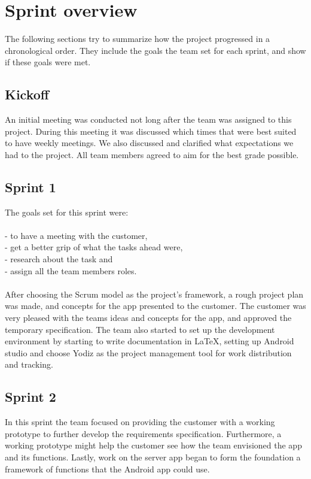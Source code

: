 \section{Sprint overview}
The following sections try to summarize how the project progressed in a chronological order. They include the goals the team set for each sprint, and show if these goals were met.


\subsection{Kickoff}
An initial meeting was conducted not long after the team was assigned to this project. During this meeting it was discussed which times that were best suited to have weekly meetings. We also discussed and clarified what expectations we had to the project. All team members agreed to aim for the best grade possible.

\subsection{Sprint 1}
The goals set for this sprint were:\\\\
- to have a meeting with the customer,\\
- get a better grip of what the tasks ahead were,\\
- research about the task and \\
- assign all the team members roles.\\\\
After choosing the Scrum model as the project's framework, a rough project plan was made, and concepts for the app presented to the customer. The customer was very pleased with the teams ideas and concepts for the app, and approved the temporary specification. The team also started to set up the development environment by starting to write documentation in \LaTeX, setting up Android studio and choose Yodiz as the project management tool for work distribution and tracking.

\subsection{Sprint 2}
In this sprint the team focused on providing the customer with a working
prototype to further develop the requirements specification. Furthermore, a
working prototype might help the customer see how the team envisioned the app
and its functions. Lastly, work on the server app began to form the
foundation a framework of functions that the Android app could use.

